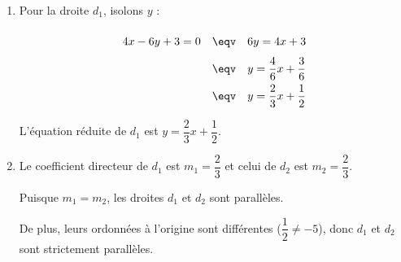 \begin{correction}
	\nline
	\begin{enumerate}
		\item Pour la droite $d_1$, isolons $y$ :
		      \[
				  \def\arraystretch{2}
			      \begin{array}{rcl}
				      4x - 6y + 3 = 0 & \eqv & 6y = 4x + 3                      \\
				                      & \eqv & y = \dfrac{4}{6}x + \dfrac{3}{6} \\
				                      & \eqv & y = \dfrac{2}{3}x + \dfrac{1}{2}
			      \end{array}
		      \]

		      L'équation réduite de $d_1$ est $y = \dfrac{2}{3}x + \dfrac{1}{2}$.

		\item Le coefficient directeur de $d_1$ est $m_1 = \dfrac{2}{3}$ et celui de $d_2$ est $m_2 = \dfrac{2}{3}$.

		      Puisque $m_1 = m_2$, les droites $d_1$ et $d_2$ sont parallèles.

		      De plus, leurs ordonnées à l'origine sont différentes ($\dfrac{1}{2} \neq -5$), donc $d_1$ et $d_2$ sont strictement parallèles.
	\end{enumerate}
\end{correction}

